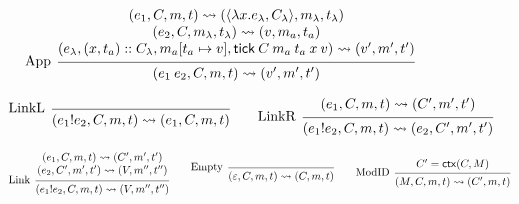 \documentclass[acmsmall,review]{acmart}\settopmatter{printfolios=true,printccs=false,printacmref=false}
\theoremstyle{definition}
\newcommand*{\cons}{::}
\newcommand*{\mem}{m}
\newcommand*{\link}[2]{{#1}\mathtt{!}{#2}}
\newcommand*{\tick}{\mathsf{tick}}
\newcommand*{\modctx}{\mathsf{ctx}}
\begin{document}
\begin{figure}[h!]
  \[
    \begin{prooftree}
      \hypo{
        \begin{matrix}
          (e_{1}, C, \mem, t)
          \rightsquigarrow
          (\langle\lambda x.e_{\lambda}, C_{\lambda}\rangle, \mem_{\lambda}, t_{\lambda}) \\
          (e_{2}, C, \mem_{\lambda}, t_{\lambda})
          \rightsquigarrow
          (v, \mem_{a}, t_{a})                                                            \\
          (e_{\lambda}, (x, t_{a})\cons C_{\lambda}, \mem_{a}[t_{a}\mapsto v], \tick\:C\:\mem_{a}\:t_{a}\:x\:v)
          \rightsquigarrow
          (v', \mem',t')
        \end{matrix}
      }
      \infer[left label={App}]1{
      (e_{1}\:e_{2}, C, \mem, t)
      \rightsquigarrow
      (v', \mem',t')
      }
    \end{prooftree}
  \]

  \[
    \begin{prooftree}
      \infer[left label=LinkL]0{
      (\link{e_{1}}{e_{2}}, C, \mem, t)
      \rightsquigarrow
      (e_{1}, C, \mem, t)
      }
    \end{prooftree}\qquad
    \begin{prooftree}
      \hypo{
        \begin{matrix}
          (e_{1}, C, \mem, t)
          \rightsquigarrow
          (C', \mem', t')
        \end{matrix}
      }
      \infer[left label=LinkR]1{
      (\link{e_{1}}{e_{2}}, C, \mem, t)
      \rightsquigarrow
      (e_{2}, C', \mem', t')
      }
    \end{prooftree}
  \]

  \[
    \begin{prooftree}
      \hypo{
        \begin{matrix}
          (e_{1}, C, \mem, t)
          \rightsquigarrow
          (C', \mem', t') \\
          (e_{2}, C', \mem', t')
          \rightsquigarrow
          (V, \mem'', t'')
        \end{matrix}
      }
      \infer[left label=Link]1{
      (\link{e_{1}}{e_{2}}, C, \mem, t)
      \rightsquigarrow
      (V, \mem'', t'')
      }
    \end{prooftree}\qquad
    \begin{prooftree}
      \infer[left label=Empty]0{
      (\varepsilon, C, \mem, t)
      \rightsquigarrow
      (C, \mem, t)
      }
    \end{prooftree}\qquad
    \begin{prooftree}
      \hypo{C'=\modctx(C,M)}
      \infer[left label=ModID]1{
      (M, C, \mem, t)
      \rightsquigarrow
      (C', \mem, t)
      }
    \end{prooftree}
  \]


\end{figure}
\end{document}
